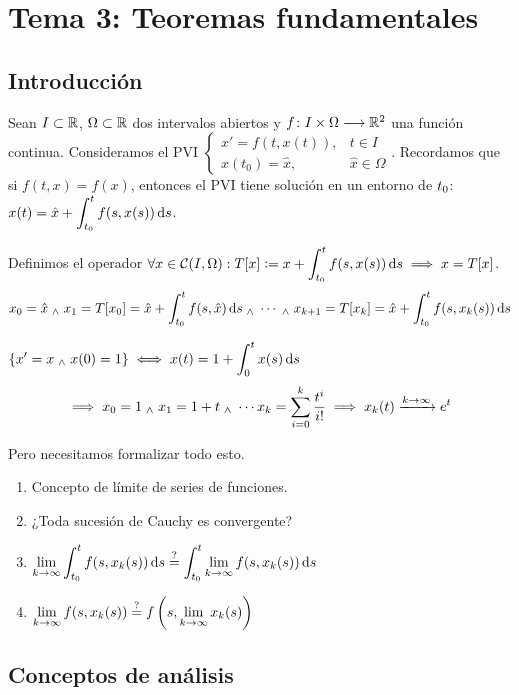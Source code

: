 
\section{Tema 3: Teoremas fundamentales}

\subsection{Introducción}

Sean $I\subset \mathbb{R}$, $\Omega \subset \mathbb{R}$ dos intervalos abiertos y $f \colon I\times \Omega \longrightarrow \mathbb{R}^2$ una función continua. Consideramos el PVI $\begin{cases}
		x'=f(t, x(t)) , & t\in I            \\
		x(t_0)=\hat{x}, & \hat{x}\in \Omega
	\end{cases}$. Recordamos que si $f(t, x)=f(x)$, entonces el PVI tiene solución en un entorno de $\displaystyle t_0$: $\ds x(t) = \hat{x} + \int_{t_0}^{t} f(s, x(s)) \odif{s}$.

Definimos el operador $\ds \forall x \in \mathcal{C}(I, \Omega) : T[x]\defeq x + \int_{t_0}^{t} f(s, x(s)) \odif{s} \implies x=T[x]$.
\[x_0 = \hat{x} \we x_1 = T[x_0] = \hat{x} + \int_{t_0}^{t} f(s, \hat{x}) \odif{s} \we \cdots \we x_{k+1} = T[x_k]= \hat{x} + \int_{t_0}^{t} f(s, x_k(s)) \odif{s}\]
\begin{ejem}
	$\ds\{x'=x \we x(0)=1\} \iff x(t)=1+\int_{0}^{t} x(s) \odif{s}$
	\[\implies x_0 = 1 \; _{\wedge} \; x_1 = 1 + t \; _{\wedge} \; \cdots x_k = \sum_{i=0}^{k} \frac{t^i}{i!} \implies x_k(t)\xrightarrow{k\to\infty} e^t\]
\end{ejem}

Pero necesitamos formalizar todo esto.
\begin{enumerate}
	\item Concepto de límite de series de funciones.
	\item ¿Toda sucesión de Cauchy es convergente?
	\item $\ds \lim_{k\to\infty} \int_{t_0}^t f(s, x_k(s)) \odif{s} \stackrel{?}{=} \int_{t_0}^t \lim_{k\to\infty} f(s, x_k(s)) \odif{s}$
	\item $\displaystyle \lim_{k\to\infty} f(s, x_k(s)) \stackrel{?}{=} f\left(s, \lim_{k\to\infty} x_k(s)\right)$
\end{enumerate}

\subsection{Conceptos de análisis}
